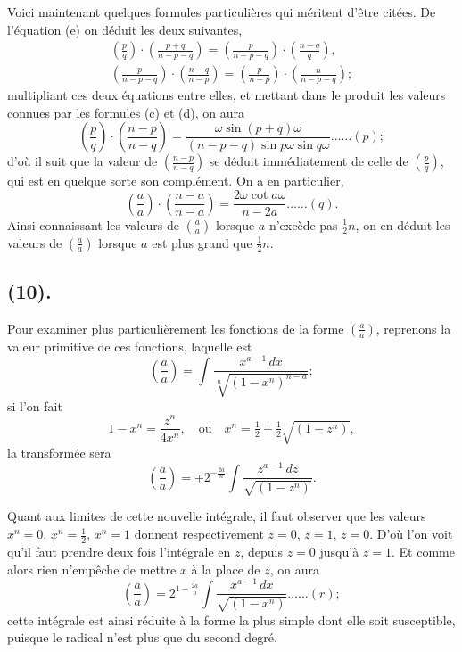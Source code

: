 \documentclass{article}
\begin{document}
Voici maintenant quelques formules particulières qui méritent d'être citées. De l'équation (e) on déduit les deux suivantes,
\[ \begin{gathered} \left(\frac{p}{q}\right)\cdot\left(\frac{p+q}{n-p-q}\right)=\left(\frac{p}{n-p-q}\right)\cdot\left(\frac{n-q}{q}\right),\\ \left(\frac{p}{n-p-q}\right)\cdot\left(\frac{n-q}{n-p}\right)=\left(\frac{p}{n-p}\right)\cdot\left(\frac{n}{n-p-q}\right); \end{gathered} \]
multipliant ces deux équations entre elles, et mettant dans le produit les valeurs connues par les formules (c) et (d), on aura
\[ \left(\frac{p}{q}\right)\cdot\left(\frac{n-p}{n-q}\right)=\frac{\omega\sin(p+q)\omega}{(n-p-q)\sin p\omega\sin q\omega}\ldots\ldots(p); \]
d'où il suit que la valeur de $\left(\frac{n-p}{n-q}\right)$ se déduit immédiatement de celle de $\left(\frac{p}{q}\right)$, qui est en quelque sorte son complément. On a en particulier,
\[ \left(\frac{a}{a}\right)\cdot\left(\frac{n-a}{n-a}\right)=\frac{2\omega\cot a\omega}{n-2a}\ldots\ldots(q). \]
Ainsi connaissant les valeurs de $\left(\frac{a}{a}\right)$ lorsque $a$ n'excède pas $\frac{1}{2}n$, on en déduit les valeurs de $\left(\frac{a}{a}\right)$ lorsque $a$ est plus grand que $\frac{1}{2}n$.

\subsection*{(10).}

Pour examiner plus particulièrement les fonctions de la forme $\left(\frac{a}{a}\right)$, reprenons la valeur primitive de ces fonctions, laquelle est
\[ \left(\frac{a}{a}\right)=\int\frac{x^{a-1}\,dx}{\sqrt[n]{(1-x^{n})^{n-a}}}; \]
si l'on fait
\[ 1-x^{n}=\frac{z^{n}}{4x^{n}},\quad\text{ou}\quad x^{n}=\tfrac{1}{2}\pm\tfrac{1}{2}\sqrt{(1-z^{n})}, \]
la transformée sera
\[ \left(\frac{a}{a}\right)=\mp 2^{-\frac{2a}{n}}\int\frac{z^{a-1}\,dz}{\sqrt{(1-z^{n})}}. \]

Quant aux limites de cette nouvelle intégrale, il faut observer que les valeurs $x^{n}=0$, $x^{n}=\frac{1}{2}$, $x^{n}=1$ donnent respectivement $z=0$, $z=1$, $z=0$. D'où l'on voit qu'il faut prendre deux fois l'intégrale en $z$, depuis $z=0$ jusqu'à $z=1$. Et comme alors rien n'empêche de mettre $x$ à la place de $z$, on aura
\[ \left(\frac{a}{a}\right)=2^{1-\frac{2a}{n}}\int\frac{x^{a-1}\,dx}{\sqrt{(1-x^{n})}}\ldots\ldots(r); \]
cette intégrale est ainsi réduite à la forme la plus simple dont elle soit susceptible, puisque le radical n'est plus que du second degré.
\end{document}
